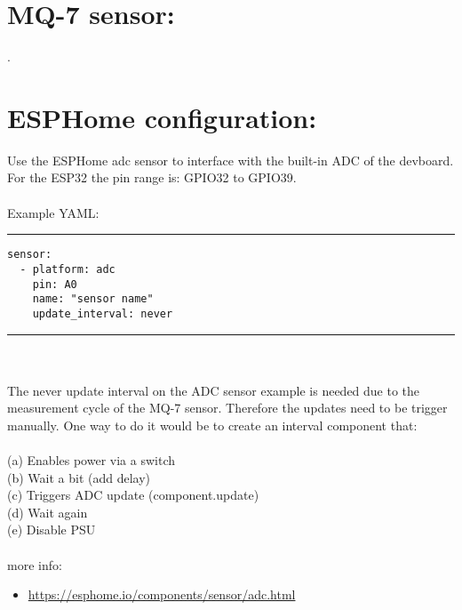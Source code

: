 \documentclass{article}
\begin{document}
\section*{MQ-7 sensor:}
.

\section*{ESPHome configuration:} 
Use the ESPHome adc sensor to interface with the built-in ADC of the devboard.
For the ESP32 the pin range is: GPIO32 to GPIO39.\\\\

Example YAML:\\
{\color{Gray} \rule{\linewidth}{0.6mm} }

\begin{verbatim}
sensor:
  - platform: adc
    pin: A0
    name: "sensor name"
    update_interval: never
\end{verbatim}
{\color{Gray} \rule{\linewidth}{0.6mm} }\\\\


The never update interval on the ADC sensor example is needed due to the measurement cycle of the MQ-7 sensor. 
Therefore the updates need to be trigger manually.
One way to do it would be to create an interval component that:\\\\
(a) Enables power via a switch\\
(b) Wait a bit (add delay)\\
(c) Triggers ADC update (component.update)\\
(d) Wait again\\
(e) Disable PSU\\\\

more info:\\
\begin{itemize}
    \item\url{https://esphome.io/components/sensor/adc.html} 
\end{itemize}
\end{document}
